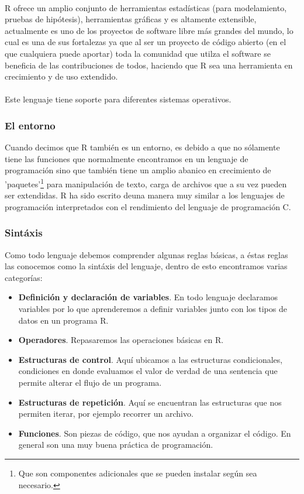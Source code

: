 \documentclass[12pt,hidelinks]{article}
\begin{document}
	\paragraph{}R ofrece un amplio conjunto de herramientas estadísticas (para modelamiento, pruebas de hipótesis), herramientas gráficas y es altamente extensible, actualmente es uno de los proyectos de software libre más grandes del mundo, lo cual es una de sus fortalezas ya que al ser un proyecto de código abierto (en el que cualquiera puede aportar) toda la comunidad que utilza el software se beneficia de las contribuciones de todos, haciendo que R sea una herramienta en crecimiento y de uso extendido.
	\paragraph{} Este lenguaje tiene soporte para diferentes sistemas operativos.
	\subsubsection{El entorno}
	Cuando decimos que R también es un entorno, es debido a que no sólamente tiene las funciones que normalmente encontramos en un lenguaje de programación sino que también tiene un amplio abanico en crecimiento de 'paquetes'\footnote{Que son componentes adicionales que se pueden instalar según sea necesario.} para manipulación de texto, carga de archivos que a su vez pueden ser extendidas. R ha sido escrito deuna manera muy similar a los lenguajes de programación interpretados con el rendimiento del lenguaje de programación C.
	\subsubsection{Sintáxis}
	Como todo lenguaje debemos comprender algunas reglas básicas, a éstas reglas las conocemos como la sintáxis del lenguaje, dentro de esto encontramos varias categorías:
	\begin{itemize}
		\item \textbf{Definición y declaración de variables}. En todo lenguaje declaramos variables por lo que aprenderemos a definir variables junto con los tipos de datos en un programa R.
		\item \textbf{Operadores}. Repasaremos las operaciones básicas en R.
		\item \textbf{Estructuras de control}. Aquí ubicamos a las estructuras condicionales, condiciones en donde evaluamos el valor de verdad de una sentencia que permite alterar el flujo de un programa.
		\item  \textbf{Estructuras de repetición}. Aquí se encuentran las estructuras que nos permiten iterar, por ejemplo recorrer un archivo.
		\item \textbf{Funciones}. Son piezas de código, que nos ayudan a organizar el código. En general son una muy buena práctica de programación.
	\end{itemize}
\end{document}
